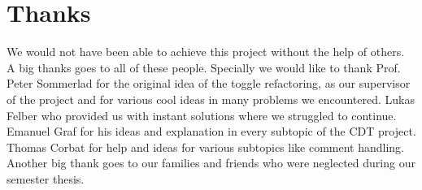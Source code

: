 \chapter*{Thanks}
We would not have been able to achieve this project without the help of others.
A big thanks goes to all of these people.\newline
Specially we would like to thank Prof. Peter Sommerlad for the original idea
of the toggle refactoring, as our supervisor of the project and for various cool
ideas in many problems we encountered. Lukas Felber who provided us with
instant solutions where we struggled to continue. Emanuel Graf for his ideas and
explanation in every subtopic of the CDT project. Thomas Corbat for help and
ideas for various subtopics like comment handling. \newline
Another big thank goes to our families and friends who were neglected during our
semester thesis.
\thispagestyle{empty}

